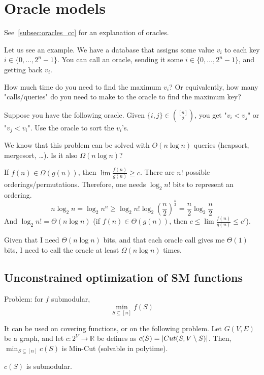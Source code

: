 \section{Oracle models}

See~\ref{subsec:oracles_cc} for an explanation of oracles.

Let us see an example.
We have a database that assigns some value $v_i$ to each key $i \in \{ 0, \dots, 2^n-1 \}$.
You can call an oracle, sending it some $i \in \{ 0, \dots, 2^n-1 \}$, and getting back $v_i$.

How much time do you need to find the maximum $v_i$?
Or equivalently, how many "calls/queries" do you need to make to the oracle to find the maximum key?

Suppose you have the following oracle.
Given $\{ i,j \} \in \binom{[n]}{2}$, you get "$v_i < v_j$" or "$v_j < v_i$".
Use the oracle to sort the $v_i$'s.

We know that this problem can be solved with $O(n \log n)$ queries (heapsort, mergesort, \dots).
Is it also $\Omega(n \log n)$?

If $f(n) \in \Omega(g(n))$, then $\lim \frac{f(n)}{g(n)} \geq c$.
There are $n!$ possible orderings/permutations.
Therefore, one needs $\log_2 n!$ bits to represent an ordering.
\[ n \log_2 n = \log_2 n^n \geq \log_2 n! \log_2 (\frac{n}{2})^{\frac{n}{2}} = \frac{n}{2} \log_2 \frac{n}{2} \]
And $\log_2 n! = \Theta(n \log n)$ (if $f(n) \in \Theta(g(n))$, then $c \leq \lim \frac{f(n)}{g(n)} \leq c'$).

Given that I need $\Theta(n \log n)$ bits, and that each oracle call gives me $\Theta(1)$ bits, I need to call the oracle at least $\Omega(n \log n)$ times.


\subsection{Unconstrained optimization of SM functions}
    Problem: for $f$ submodular,
    \[ \min_{S \subseteq [n]} f(S) \]

    It can be used on covering functions, or on the following problem.
    Let $G(V,E)$ be a graph, and let $c : 2^V \rightarrow \mathbb{R}$ be defines as $c(S) = \vert Cut(S, V \setminus S) \vert$. Then, $\min_{S \subseteq [n]} c(S)$ is Min-Cut (solvable in polytime).

    \begin{lemma}
        $c(S)$ is submodular.
    \end{lemma}

